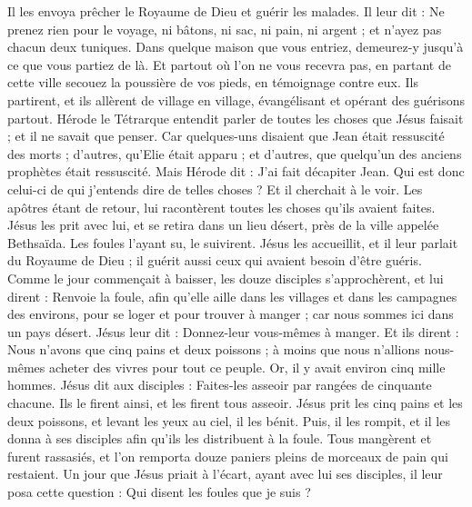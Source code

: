 \begin{multicols}{2}
{Il les envoya prêcher le Royaume de Dieu et guérir les malades.
Il leur dit : Ne prenez rien pour le voyage, ni bâtons, ni sac, ni pain, ni argent ; et n'ayez pas chacun deux tuniques.
Dans quelque maison que vous entriez, demeurez-y jusqu'à ce que vous partiez de là.
Et partout où l'on ne vous recevra pas, en partant de cette ville secouez la poussière de vos pieds, en témoignage contre eux.
Ils partirent, et ils allèrent de village en village, évangélisant et opérant des guérisons partout.
Hérode le Tétrarque entendit parler de toutes les choses que Jésus faisait ; et il ne savait que penser. Car quelques-uns disaient que Jean était ressuscité des morts ;
d’autres, qu'Elie était apparu ; et d'autres, que quelqu'un des anciens prophètes était ressuscité.
Mais Hérode dit : J'ai fait décapiter Jean. Qui est donc celui-ci de qui j'entends dire de telles choses ? Et il cherchait à le voir.
Les apôtres étant de retour, lui racontèrent toutes les choses qu'ils avaient faites. Jésus les prit avec lui, et se retira dans un lieu désert, près de la ville appelée Bethsaïda.
Les foules l’ayant su, le suivirent. Jésus les accueillit, et il leur parlait du Royaume de Dieu ; il guérit aussi ceux qui avaient besoin d'être guéris.
Comme le jour commençait à baisser, les douze disciples s’approchèrent, et lui dirent : Renvoie la foule, afin qu’elle aille dans les villages et dans les campagnes des environs, pour se loger et pour trouver à manger ; car nous sommes ici dans un pays désert.
Jésus leur dit : Donnez-leur vous-mêmes à manger. Et ils dirent : Nous n'avons que cinq pains et deux poissons ; à moins que nous n'allions nous-mêmes acheter des vivres pour tout ce peuple.
Or, il y avait environ cinq mille hommes. Jésus dit aux disciples : Faites-les asseoir par rangées de cinquante chacune.
Ils le firent ainsi, et les firent tous asseoir.
Jésus prit les cinq pains et les deux poissons, et levant les yeux au ciel, il les bénit. Puis, il les rompit, et il les donna à ses disciples afin qu'ils les distribuent à la foule.
Tous mangèrent et furent rassasiés, et l’on remporta douze paniers pleins de morceaux de pain qui restaient.
Un jour que Jésus priait à l'écart, ayant avec lui ses disciples, il leur posa cette question : Qui disent les foules que je suis ?
}
\end{multicols}
